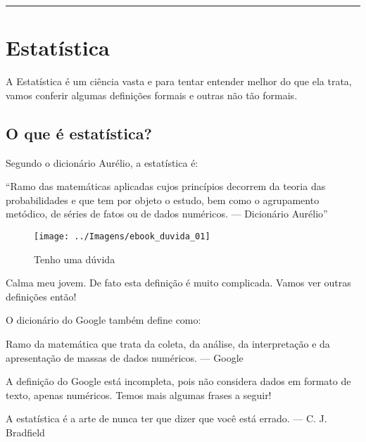 \documentclass[11pt,]{style/krantz}
\renewenvironment{quote}{\begin{VF}}{\end{VF}}
\theoremstyle{definition}
\theoremstyle{definition}
\theoremstyle{definition}
\theoremstyle{remark}
\begin{document}
\begin{center}\rule{0.5\linewidth}{\linethickness}\end{center}

\mainmatter

\hypertarget{estatistica}{%
\chapter{Estatística}\label{estatistica}}

A Estatística é um ciência vasta e para tentar entender melhor do que ela trata, vamos conferir algumas definições formais e outras não tão formais.

\hypertarget{o-que-e-estatistica}{%
\section{O que é estatística?}\label{o-que-e-estatistica}}

Segundo o dicionário Aurélio, a estatística é:

\begin{quote}
``Ramo das matemáticas aplicadas cujos princípios decorrem da teoria das probabilidades e que tem por objeto o estudo, bem como o agrupamento metódico, de séries de fatos ou de dados numéricos. --- Dicionário Aurélio''
\end{quote}

\begin{figure}[H]

{\centering \texttt{[image: ../Imagens/ebook\_duvida\_01]} 

}

\caption{Tenho uma dúvida}\label{fig:fig01}
\end{figure}

Calma meu jovem. De fato esta definição é muito complicada. Vamos ver outras definições então!

O dicionário do Google também define como:

\begin{quote}
Ramo da matemática que trata da coleta, da análise, da interpretação e da apresentação de massas de dados numéricos. --- Google
\end{quote}

A definição do Google está incompleta, pois não considera dados em formato de texto, apenas numéricos. Temos mais algumas frases a seguir!

\begin{quote}
A estatística é a arte de nunca ter que dizer que você está errado. --- C. J. Bradfield
\end{quote}
\end{document}
